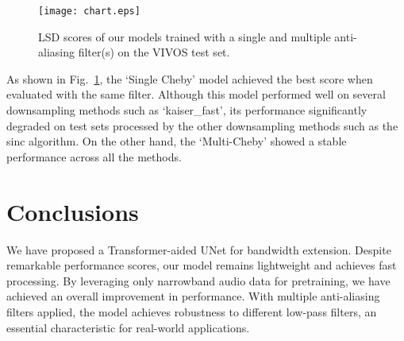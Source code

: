 \documentclass{article}
\begin{document}
\begin{figure}
    \centering
    \texttt{[image: chart.eps]}
    \caption{LSD scores of our models trained with a single and multiple anti-aliasing filter(s) on the VIVOS test set.}
    \label{fig:lpf_score}
\end{figure}

As shown in Fig.~\ref{fig:lpf_score}, the `Single Cheby' model achieved the best score when evaluated with the same filter. Although this model performed well on several downsampling methods such as `kaiser\_fast', its performance significantly degraded on test sets processed by the other downsampling methods such as the sinc algorithm. On the other hand, the `Multi-Cheby' showed a stable performance across all the methods. \vspace{-0.6cm}






\section{Conclusions}
\label{sec:conclude}
\vspace{-0.3cm}
We have proposed a Transformer-aided UNet for bandwidth extension. Despite remarkable performance scores, our model remains lightweight and achieves fast processing. By leveraging only narrowband audio data for pretraining, we have achieved an overall improvement in performance. With multiple anti-aliasing filters applied, the model achieves robustness to different low-pass filters, an essential characteristic for real-world applications.
\vfill\pagebreak




\end{document}
